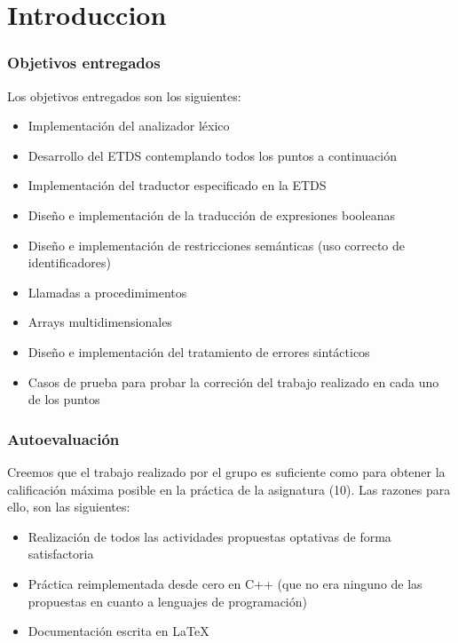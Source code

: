 \chapter{Introduccion}

\subsection{Objetivos entregados}

Los objetivos entregados son los siguientes:

\begin{itemize}
    \item Implementación del analizador léxico 
    \item Desarrollo del ETDS contemplando todos los puntos a continuación
    \item Implementación del traductor especificado en la ETDS
    \item Diseño e implementación de la traducción de expresiones booleanas
    \item Diseño e implementación de restricciones semánticas (uso correcto de identificadores)
    \item Llamadas a procedimimentos
    \item Arrays multidimensionales
    \item Diseño e implementación del tratamiento de errores sintácticos
    \item Casos de prueba para probar la correción del trabajo realizado en cada uno de los puntos

\end{itemize}

\subsection{Autoevaluación}

Creemos que el trabajo realizado por el grupo es suficiente como para obtener la calificación máxima posible en la práctica de la asignatura (10). Las razones para ello, son las siguientes:

\begin{itemize}
    \item Realización de todos las actividades propuestas optativas de forma satisfactoria
    \item Práctica reimplementada desde cero en C++ (que no era ninguno de las propuestas en cuanto a lenguajes de programación)
    \item Documentación escrita en \LaTeX

\end{itemize}
